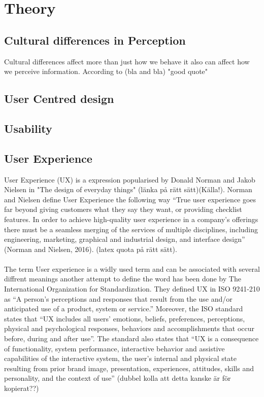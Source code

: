 
\chapter{Theory} %

\label{Chapter1} %




\section{Cultural differences in Perception}
Cultural differences affect more than just how we behave it also can affect how we perceive information. According to (bla and bla) "good quote" \cite{Holistic_vs_Analytic}
\section{User Centred design}
\section{Usability}
\section{User Experience}
User Experience (UX) is a expression popularised by Donald Norman and Jakob Nielsen in "The design of everyday things" (länka på rätt sätt)(Källa!). Norman and Nielsen define User Experience the following way “True user experience goes far beyond giving customers what they say they want, or providing checklist features. In order to achieve high-quality user experience in a company’s offerings there must be a seamless merging of the services of multiple disciplines, including engineering, marketing, graphical and industrial design, and interface design” (Norman and Nielsen, 2016). (latex quota på rätt sätt). 
\\\\
The term User experience is a widly used term and can be associated with several diffrent meanings another attempt to define the word has been done by The International Organization for Standardization. They defined UX in ISO 9241-210 as “A person's perceptions and responses that result from the use and/or anticipated use of a product, system or service.” Moreover, the ISO standard states that “UX includes all
users' emotions, beliefs, preferences, perceptions, physical and psychological
responses, behaviors and accomplishments that occur before, during and after use”. The standard also states that “UX is a consequence of
functionality, system performance, interactive behavior and assistive capabilities of the interactive system, the user's internal and physical state resulting from prior brand image, presentation,
experiences, attitudes, skills and personality, and the context of use” (dubbel kolla att detta kanske är för kopierat??)





